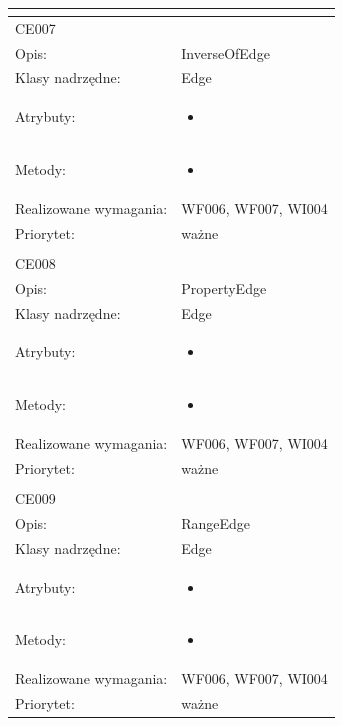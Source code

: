 \documentclass[a4paper,10pt]{article}
\begin{document}
\begin{center}
\begin{longtable}{|m{3cm}|m{9cm}|}
\multicolumn{2}{c}{} \\
 \hline

CE007 &  \\ \hline
Opis: & InverseOfEdge    \\ \hline
Klasy nadrzędne: & Edge    \\ \hline
Atrybuty: & \begin{itemize}
 \item 
\end{itemize}
 \\ \hline
Metody: & \begin{itemize}
 \item 
\end{itemize}
  \\ \hline
Realizowane wymagania: & WF006, WF007, WI004 \\ \hline
Priorytet: & ważne  \\ \hline

\multicolumn{2}{c}{} \\
 \hline

CE008 &  \\ \hline
Opis: & PropertyEdge    \\ \hline
Klasy nadrzędne: & Edge    \\ \hline
Atrybuty: & \begin{itemize}
 \item 
\end{itemize}
 \\ \hline
Metody: & \begin{itemize}
 \item 
\end{itemize}
  \\ \hline
Realizowane wymagania: & WF006, WF007, WI004 \\ \hline
Priorytet: & ważne  \\ \hline

\multicolumn{2}{c}{} \\
 \hline

CE009 &  \\ \hline
Opis: & RangeEdge    \\ \hline
Klasy nadrzędne: & Edge    \\ \hline
Atrybuty: & \begin{itemize}
 \item 
\end{itemize}
 \\ \hline
Metody: & \begin{itemize}
 \item 
\end{itemize}
  \\ \hline
Realizowane wymagania: & WF006, WF007, WI004 \\ \hline
Priorytet: & ważne  \\ \hline


\end{longtable}
\end{center}
\end{document}
